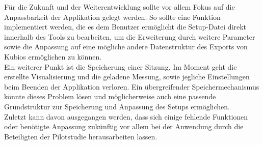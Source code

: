 Für die Zukunft und der Weiterentwicklung sollte vor allem Fokus auf die Anpassbarkeit der Applikation gelegt werden. So sollte eine Funktion implementiert werden, die es dem Benutzer ermöglicht die Setup-Datei direkt innerhalb des Tools zu bearbeiten, um die Erweiterung durch weitere Parameter sowie die Anpassung auf eine mögliche andere Datenstruktur des Exports von Kubios ermöglichen zu können.\\
Ein weiterer Punkt ist die Speicherung einer Sitzung. Im Moment geht die erstellte Visualisierung und die geladene Messung, sowie jegliche Einstellungen beim Beenden der Applikation verloren. Ein übergreifender Speichermechanismus könnte dieses Problem lösen und möglicherweise auch eine passende Grundstruktur zur Speicherung und Anpassung des Setups ermöglichen.\\
Zuletzt kann davon ausgegangen werden, dass sich einige fehlende Funktionen oder benötigte Anpassung zukünftig vor allem bei der Anwendung durch die Beteiligten der Pilotstudie herausarbeiten lassen.